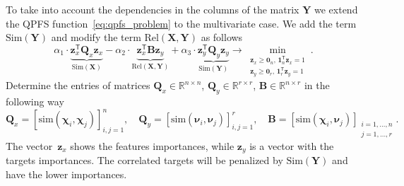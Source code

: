 \documentclass[12pt,twoside]{article}
\theoremstyle{definition}
\newcommand{\bz}{\mathbf{z}}
\newcommand{\bY}{\mathbf{Y}}
\newcommand{\bX}{\mathbf{X}}
\newcommand{\bB}{\mathbf{B}}
\newcommand{\bQ}{\mathbf{Q}}
\newcommand{\bbR}{\mathbb{R}}
\newcommand{\T}{\mathsf{T}}
\newcommand{\bchi}{\boldsymbol{\chi}}
\newcommand{\bnu}{\boldsymbol{\nu}}
\newcommand{\bOne}{\boldsymbol{1}}
\newcommand{\bZero}{\boldsymbol{0}}
\begin{document}
To take into account the dependencies in the columns of the matrix $\bY$ we extend the QPFS function~\eqref{eq:qpfs_problem} to the multivariate case.
We add the term~$\text{Sim}(\bY)$ and modify the term $\text{Rel}(\bX, \bY)$ as follows
\begin{equation}
\alpha_1 \cdot \underbrace{\bz_x^{\T} \bQ_x \bz_x}_{\text{Sim}(\bX)} - \alpha_2 \cdot \underbrace{\bz_x^{\T} \bB \bz_y}_{\text{Rel}(\bX, \bY)} + \alpha_3 \cdot \underbrace{\bz_y^{\T} \bQ_y \bz_y}_{\text{Sim}(\bY)} \rightarrow \min_{\substack{\bz_x \geq \bZero_n, \, \bOne_n^{\T}\bz_x=1 \\ \bz_y \geq \bZero_r, \, \bOne_r^{\T}\bz_y=1}}.
\label{eq:symimp}
\end{equation}
Determine the entries of matrices $\bQ_x \in \bbR^{n \times n}$, $\bQ_y \in \bbR^{r \times r}$, $\bB \in \bbR^{n \times r}$ in the following way
\begin{equation*}
\bQ_x = \left[ \text{sim}(\bchi_i, \bchi_j) \right]_{i,j=1}^n, \quad
\bQ_y = \left[ \text{sim}(\bnu_i, \bnu_j) \right]_{i,j=1}^r, \quad
\bB =  \left[ \text{sim}(\bchi_i, \bnu_j) \right]_{\substack{i=1, \dots, n \\ j=1, \dots, r}}.
\end{equation*}
The vector~$\bz_x$ shows the features importances, while $\bz_y$ is a vector with the targets importances.
The correlated targets will be penalized by $\text{Sim} (\bY)$ and have the lower importances.
\end{document}
